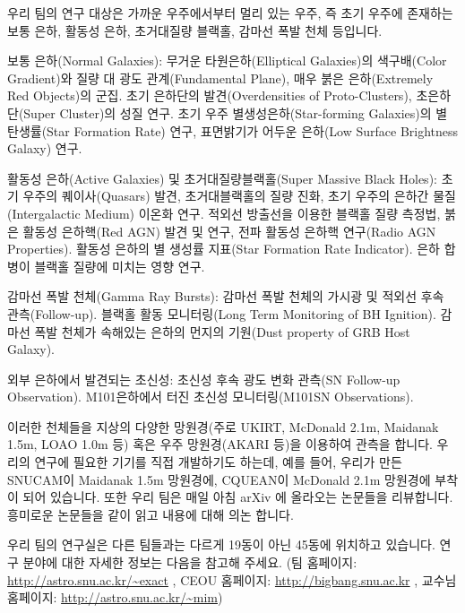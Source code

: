 우리 팀의 연구 대상은 가까운 우주에서부터 멀리 있는 우주, 즉 초기 우주에 존재하는 보통 은하, 활동성 은하, 초거대질량 블랙홀, 감마선 폭발 천체 등입니다.
\begin{packed_enum}
\item 보통 은하(Normal Galaxies): 무거운 타원은하(Elliptical Galaxies)의 색구배(Color Gradient)와 질량 대 광도 관계(Fundamental Plane), 매우 붉은 은하(Extremely Red Objects)의 군집. 초기 은하단의 발견(Overdensities of Proto-Clusters), 초은하단(Super Cluster)의 성질 연구. 초기 우주 별생성은하(Star-forming Galaxies)의 별 탄생률(Star Formation Rate) 연구, 표면밝기가 어두운 은하(Low Surface Brightness Galaxy) 연구.
\item 활동성 은하(Active Galaxies) 및 초거대질량블랙홀(Super Massive Black Holes): 초기 우주의 퀘이사(Quasars) 발견, 초거대블랙홀의 질량 진화, 초기 우주의 은하간 물질(Intergalactic Medium) 이온화 연구. 적외선 방출선을 이용한 블랙홀 질량 측정법, 붉은 활동성 은하핵(Red AGN) 발견 및 연구, 전파 활동성 은하핵 연구(Radio AGN Properties). 활동성 은하의 별 생성률 지표(Star Formation Rate Indicator). 은하 합병이 블랙홀 질량에 미치는 영향 연구.
\item 감마선 폭발 천체(Gamma Ray Bursts): 감마선 폭발 천체의 가시광 및 적외선 후속 관측(Follow-up). 블랙홀 활동 모니터링(Long Term Monitoring of BH Ignition). 감마선 폭발 천체가 속해있는 은하의 먼지의 기원(Dust property of GRB Host Galaxy).
\item 외부 은하에서 발견되는 초신성: 초신성 후속 광도 변화 관측(SN Follow-up Observation). M101은하에서 터진 초신성 모니터링(M101SN Observations).
\end{packed_enum}
이러한 천체들을 지상의 다양한 망원경(주로 UKIRT, McDonald 2.1m, Maidanak 1.5m, LOAO 1.0m 등) 혹은 우주 망원경(AKARI 등)을 이용하여 관측을 합니다. 우리의 연구에 필요한 기기를 직접 개발하기도 하는데, 예를 들어, 우리가 만든 SNUCAM이 Maidanak 1.5m 망원경에, CQUEAN이 McDonald 2.1m 망원경에 부착이 되어 있습니다. 또한 우리 팀은 매일 아침 arXiv 에 올라오는 논문들을 리뷰합니다. 흥미로운 논문들을 같이 읽고 내용에 대해 의논 합니다.

우리 팀의 연구실은 다른 팀들과는 다르게 19동이 아닌 45동에 위치하고 있습니다. 연구 분야에 대한 자세한 정보는 다음을 참고해 주세요. (팀 홈페이지: \url{http://astro.snu.ac.kr/~exact} , CEOU 홈페이지: \url{http://bigbang.snu.ac.kr} , 교수님 홈페이지: \url{http://astro.snu.ac.kr/~mim})

